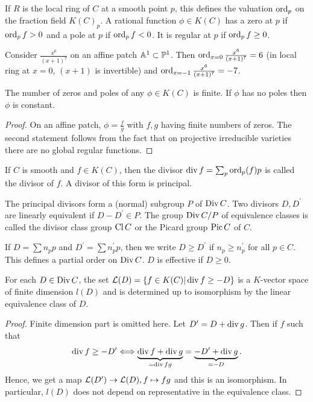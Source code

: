 \documentclass[a4paper,11pt]{article}
\begin{document}
			If $R$ is the local ring of $C$ at a smooth point $p$, this defines the valuation $\ord_p$ on the fraction field $K(C)_p$. A rational function $\phi\in K(C)$ has a zero at $p$ if $\ord_pf>0$ and a pole at $p$ if $\ord_pf<0$. It is regular at $p$ if $\ord_pf\ge0$.

			\begin{eg}
				Consider $\frac{x^6}{(x+1)^7}$ on an affine patch $\AA^1\subset\P^1$. Then $\ord_{x=0}\frac{x^6}{(x+1)^7}=6$ (in local ring at $x=0$, $(x+1)$ is invertible) and $\ord_{x=-1}\frac{x^6}{(x+1)^7}=-7$.
			\end{eg}

			\begin{prop}
				The number of zeros and poles of any $\phi\in K(C)$ is finite. If $\phi$ has no poles then $\phi$ is constant. 
			\end{prop}
			\begin{proof}
				On an affine patch, $\phi=\frac{f}{g}$ with $f,g$ having finite numbers of zeros. The second statement follows from the fact that on projective irreducible varieties there are no global regular functions.
			\end{proof}

			\begin{defi}
				If $C$ is smooth and $f\in K(C)$, then the divisor $\divv f=\sum_p\ord_p(f)p$ is called the divisor of $f$. A divisor of this form is principal.
			\end{defi}

			\begin{remark}\label{rem--Picard}
				The principal divisors form a (normal) subgroup $P$ of $\Div C$. Two divisors $D,D^\prime$ are linearly equivalent if $D-D^\prime\in P$. The group $\Div C/P$ of equivalence classes is called the divisor class group $\cl C$ or the Picard group $\pic C$ of $C$. 
			\end{remark}

			\begin{defi}
				If $D=\sum n_pp$ and $D^\prime=\sum n_p^\prime p$, then we write $D\ge D^\prime$ if $n_p\ge n_{p}^\prime$ for all $p\in C$. This defines a partial order on $\Div C$. $D$ is effective if $D\ge 0$.
			\end{defi}

			\begin{prop}
				For each $D\in\Div C$, the set $\L(D)=\{f\in K(C)|\divv f\ge-D\}$ is a $K$-vector space of finite dimension $l(D)$ and is determined up to isomorphism by the linear equivalence class of $D$.
			\end{prop}
			\begin{proof}
				Finite dimension part is omitted here. Let $D^\prime=D+\divv g$. Then if $f$ such that
				\begin{equation*}
					\divv f\ge-D^\prime\Longleftrightarrow \underbrace{\divv f+\divv g}_{=\divv fg}=\underbrace{-D^\prime+\divv g}_{=-D}.
				\end{equation*} 
				Hence, we get a map $\L(D^\prime)\rightarrow\L(D),f\mapsto fg$ and this is an isomorphism. In particular, $l(D)$ does not depend on representative in the equivalence class.
			\end{proof}
\end{document}
